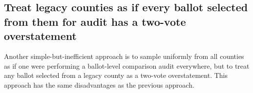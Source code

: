 \documentclass[runningheads]{llncs}
\begin{document}
%

\subsection{Treat legacy counties as if every ballot selected from them for audit has a two-vote overstatement}\label{sec:two-vote-over}
Another simple-but-inefficient approach is to sample uniformly from all counties as if one
were performing a ballot-level comparison audit everywhere,  but to 
treat any ballot
selected from a legacy county as a two-vote overstatement. 
This approach has the same disadvantages
as the previous approach.
\end{document}
